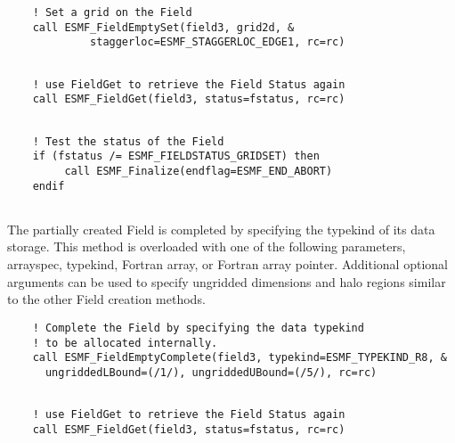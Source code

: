  \begin{verbatim}
    ! Set a grid on the Field
    call ESMF_FieldEmptySet(field3, grid2d, &
             staggerloc=ESMF_STAGGERLOC_EDGE1, rc=rc)
 
\end{verbatim}
 

 \begin{verbatim}
    ! use FieldGet to retrieve the Field Status again
    call ESMF_FieldGet(field3, status=fstatus, rc=rc)
 
\end{verbatim}
 

 \begin{verbatim}
    ! Test the status of the Field
    if (fstatus /= ESMF_FIELDSTATUS_GRIDSET) then
         call ESMF_Finalize(endflag=ESMF_END_ABORT)
    endif
 
\end{verbatim}
 

     The partially created Field is completed by specifying the typekind of its
     data storage. This method is overloaded with one of the
     following parameters, arrayspec, typekind, Fortran array, or Fortran array pointer.
     Additional optional arguments can be used to specify ungridded dimensions and
     halo regions similar to the other Field creation methods. 

 \begin{verbatim}
    ! Complete the Field by specifying the data typekind
    ! to be allocated internally.
    call ESMF_FieldEmptyComplete(field3, typekind=ESMF_TYPEKIND_R8, &
      ungriddedLBound=(/1/), ungriddedUBound=(/5/), rc=rc)
 
\end{verbatim}
 

 \begin{verbatim}
    ! use FieldGet to retrieve the Field Status again
    call ESMF_FieldGet(field3, status=fstatus, rc=rc)
 
\end{verbatim}
 


